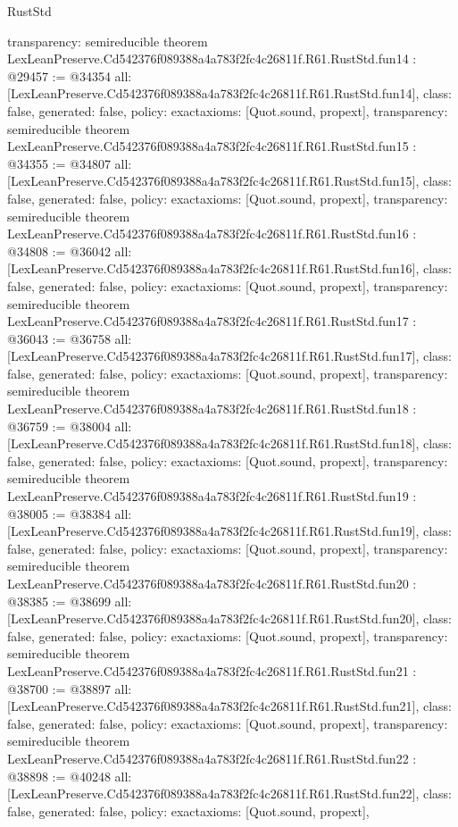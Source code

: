 \begin{lexlean}{RustStd}
\begin{coremodule}
{  transparency: semireducible
}
theorem LexLeanPreserve.Cd542376f089388a4a783f2fc4c26811f.R61.RustStd.fun14 : @29457 := @34354 {
  all: [LexLeanPreserve.Cd542376f089388a4a783f2fc4c26811f.R61.RustStd.fun14],
  class: false,
  generated: false,
  policy: exact{axioms: [Quot.sound, propext]},
  transparency: semireducible
}
theorem LexLeanPreserve.Cd542376f089388a4a783f2fc4c26811f.R61.RustStd.fun15 : @34355 := @34807 {
  all: [LexLeanPreserve.Cd542376f089388a4a783f2fc4c26811f.R61.RustStd.fun15],
  class: false,
  generated: false,
  policy: exact{axioms: [Quot.sound, propext]},
  transparency: semireducible
}
theorem LexLeanPreserve.Cd542376f089388a4a783f2fc4c26811f.R61.RustStd.fun16 : @34808 := @36042 {
  all: [LexLeanPreserve.Cd542376f089388a4a783f2fc4c26811f.R61.RustStd.fun16],
  class: false,
  generated: false,
  policy: exact{axioms: [Quot.sound, propext]},
  transparency: semireducible
}
theorem LexLeanPreserve.Cd542376f089388a4a783f2fc4c26811f.R61.RustStd.fun17 : @36043 := @36758 {
  all: [LexLeanPreserve.Cd542376f089388a4a783f2fc4c26811f.R61.RustStd.fun17],
  class: false,
  generated: false,
  policy: exact{axioms: [Quot.sound, propext]},
  transparency: semireducible
}
theorem LexLeanPreserve.Cd542376f089388a4a783f2fc4c26811f.R61.RustStd.fun18 : @36759 := @38004 {
  all: [LexLeanPreserve.Cd542376f089388a4a783f2fc4c26811f.R61.RustStd.fun18],
  class: false,
  generated: false,
  policy: exact{axioms: [Quot.sound, propext]},
  transparency: semireducible
}
theorem LexLeanPreserve.Cd542376f089388a4a783f2fc4c26811f.R61.RustStd.fun19 : @38005 := @38384 {
  all: [LexLeanPreserve.Cd542376f089388a4a783f2fc4c26811f.R61.RustStd.fun19],
  class: false,
  generated: false,
  policy: exact{axioms: [Quot.sound, propext]},
  transparency: semireducible
}
theorem LexLeanPreserve.Cd542376f089388a4a783f2fc4c26811f.R61.RustStd.fun20 : @38385 := @38699 {
  all: [LexLeanPreserve.Cd542376f089388a4a783f2fc4c26811f.R61.RustStd.fun20],
  class: false,
  generated: false,
  policy: exact{axioms: [Quot.sound, propext]},
  transparency: semireducible
}
theorem LexLeanPreserve.Cd542376f089388a4a783f2fc4c26811f.R61.RustStd.fun21 : @38700 := @38897 {
  all: [LexLeanPreserve.Cd542376f089388a4a783f2fc4c26811f.R61.RustStd.fun21],
  class: false,
  generated: false,
  policy: exact{axioms: [Quot.sound, propext]},
  transparency: semireducible
}
theorem LexLeanPreserve.Cd542376f089388a4a783f2fc4c26811f.R61.RustStd.fun22 : @38898 := @40248 {
  all: [LexLeanPreserve.Cd542376f089388a4a783f2fc4c26811f.R61.RustStd.fun22],
  class: false,
  generated: false,
  policy: exact{axioms: [Quot.sound, propext]},
}
\end{coremodule}
\end{lexlean}
